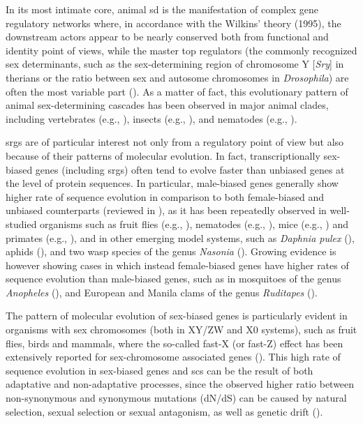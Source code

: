 \documentclass[../main.tex]{subfiles}
\begin{document}
In its most intimate core, animal \gls{sd} is the manifestation of complex gene regulatory networks where, in accordance with the Wilkins’ theory (1995), the downstream actors appear to be nearly conserved both from functional and identity point of views, while the master top regulators (the commonly recognized sex determinants, such as the sex-determining region of chromosome Y [\textit{Sry}] in therians or the ratio between sex and autosome chromosomes in \textit{Drosophila}) are often the most variable part (\textbf{\cite{beukeboom2014evolution}}). As a matter of fact, this evolutionary pattern of animal sex-determining cascades has been observed in major animal clades, including vertebrates (e.g., \textbf{\cite{marshall2010homologies}}), insects (e.g., \textbf{\cite{verhulst2010insect}}), and nematodes (e.g., \textbf{\cite{stothard2003sex}}).

\Glspl{srg} are of particular interest not only from a regulatory point of view but also because of their patterns of molecular evolution. In fact, transcriptionally sex-biased genes (including \glspl{srg}) often tend to evolve faster than unbiased genes at the level of protein sequences. In particular, male-biased genes generally show higher rate of sequence evolution in comparison to both female-biased and unbiased counterparts (reviewed in \textbf{\cite{parsch2013evolutionary,grath2016sex}}), as it has been repeatedly observed in well-studied organisms such as fruit flies (e.g., \textbf{\cite{meisel2013faster}}), nematodes (e.g., \textbf{\cite{cutter2005sexual}}), mice (e.g., \textbf{\cite{kousathanas2014faster}}) and primates (e.g., \textbf{\cite{khaitovich2005parallel}}), and in other emerging model systems, such as \textit{Daphnia pulex} (\textbf{\cite{eads2007profiling}}), aphids (\textbf{\cite{purandare2014accelerated}}), and two wasp species of the genus \textit{Nasonia} (\textbf{\cite{wang2015nasonia}}). Growing evidence is however showing cases in which instead female-biased genes have higher rates of sequence evolution than male-biased genes, such as in mosquitoes of the genus \textit{Anopheles} (\textbf{\cite{papa2017anopheles}}), and European and Manila clams of the genus \textit{Ruditapes} (\textbf{\cite{ghiselli2018comparative}}).

The pattern of molecular evolution of sex-biased genes is particularly evident in organisms with sex chromosomes (both in XY/ZW and X0 systems), such as fruit flies, birds and mammals, where the so-called fast-X (or fast-Z) effect has been extensively reported for sex-chromosome associated genes (\textbf{\cite{vicoso2006evolutionXchrom,meisel2013faster,mank2007fastZ}}). This high rate of sequence evolution in sex-biased genes and \glspl{sc} can be the result of both adaptative and non-adaptative processes, since the observed higher ratio between non-synonymous and synonymous mutations (dN/dS) can be caused by natural selection, sexual selection or sexual antagonism, as well as genetic drift (\textbf{\cite{vicoso2006evolutionXchrom,parsch2013evolutionary,meisel2013faster,grath2016sex}}).
\end{document}
